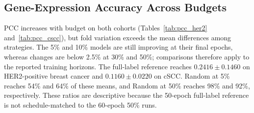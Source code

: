 \documentclass[]{spie}
\begin{document}
\subsection{Gene-Expression Accuracy Across Budgets}

PCC increases with budget on both cohorts (Tables~\ref{tab:pcc_her2} and~\ref{tab:pcc_cscc}), but fold variation exceeds the mean differences among strategies. The 5\% and 10\% models are still improving at their final epochs, whereas changes are below 2.5\% at 30\% and 50\%; comparisons therefore apply to the reported training horizons. The full-label reference reaches $0.2416\pm0.1460$ on HER2-positive breast cancer and $0.1160\pm0.0220$ on cSCC. Random at 5\% reaches 54\% and 64\% of these means, and Random at 50\% reaches 98\% and 92\%, respectively. These ratios are descriptive because the 50-epoch full-label reference is not schedule-matched to the 60-epoch 50\% runs.

\begin{table}[htbp]
\centering
\caption{HER2-positive breast cancer PCC, mean $\pm$ SD over four folds. Bold marks the largest mean per budget; cost is the range of fold-median scoring times at 50\%.}
\label{tab:pcc_her2}
\end{table}
\end{document}
